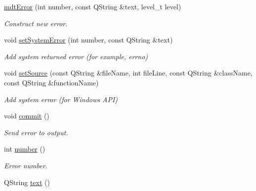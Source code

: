 \begin{DoxyCompactItemize}
\item 
\hypertarget{classmdt_error_a377c175cc8e1aeae543cae2ecc5ca87b}{
\hyperlink{classmdt_error_a377c175cc8e1aeae543cae2ecc5ca87b}{mdtError} (int number, const QString \&text, level\_\-t level)}
\label{classmdt_error_a377c175cc8e1aeae543cae2ecc5ca87b}

\begin{DoxyCompactList}\small\item\em Construct new error. \end{DoxyCompactList}\item 
\hypertarget{classmdt_error_a49254fdb566fee1a4adafe6a3694befc}{
void \hyperlink{classmdt_error_a49254fdb566fee1a4adafe6a3694befc}{setSystemError} (int number, const QString \&text)}
\label{classmdt_error_a49254fdb566fee1a4adafe6a3694befc}

\begin{DoxyCompactList}\small\item\em Add system returned error (for example, errno) \end{DoxyCompactList}\item 
void \hyperlink{classmdt_error_a0df51beab0ddaba26d5194690303d682}{setSource} (const QString \&fileName, int fileLine, const QString \&className, const QString \&functionName)
\begin{DoxyCompactList}\small\item\em Add system error (for Windows API) \end{DoxyCompactList}\item 
\hypertarget{classmdt_error_ad3cccf7c7f7d4bdabdcb4e60794bb9cb}{
void \hyperlink{classmdt_error_ad3cccf7c7f7d4bdabdcb4e60794bb9cb}{commit} ()}
\label{classmdt_error_ad3cccf7c7f7d4bdabdcb4e60794bb9cb}

\begin{DoxyCompactList}\small\item\em Send error to output. \end{DoxyCompactList}\item 
\hypertarget{classmdt_error_ae1a118da6923baaf386c7ab5f08b3549}{
int \hyperlink{classmdt_error_ae1a118da6923baaf386c7ab5f08b3549}{number} ()}
\label{classmdt_error_ae1a118da6923baaf386c7ab5f08b3549}

\begin{DoxyCompactList}\small\item\em Error number. \end{DoxyCompactList}\item 
\hypertarget{classmdt_error_a3d1bbc08e84ef25d45054b8d440989e6}{
QString \hyperlink{classmdt_error_a3d1bbc08e84ef25d45054b8d440989e6}{text} ()}
\label{classmdt_error_a3d1bbc08e84ef25d45054b8d440989e6}


\end{DoxyCompactItemize}

